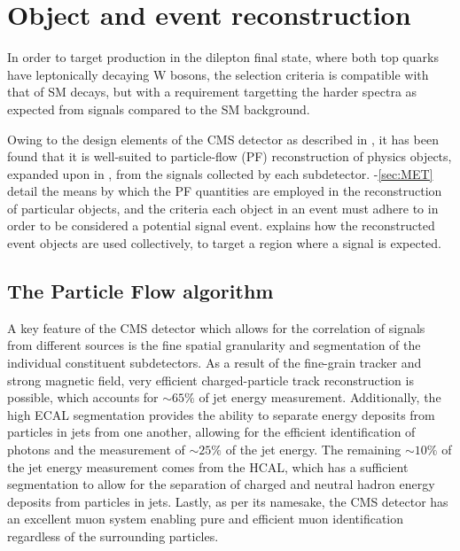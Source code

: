 \chapter{Object and event reconstruction}
\label{chap:eventreco}

In order to target \ttDM production in the dilepton final state, where both top quarks have leptonically decaying W bosons, the selection criteria is compatible with that of SM \ttll decays, but with a requirement targetting the harder \MET spectra as expected from signals compared to the SM background.

Owing to the design elements of the CMS detector as described in , it has been found that it is well-suited to particle-flow (PF) reconstruction of physics objects, expanded upon in , from the signals collected by each subdetector. -\ref{sec:MET} detail the means by which the PF quantities are employed in the reconstruction of particular objects, and the criteria each object in an event must adhere to in order to be considered a potential signal event.  explains how the reconstructed event objects are used collectively, to target a region where a \ttllDM signal is expected.

\section{The Particle Flow algorithm}
\label{sec:PF}

A key feature of the CMS detector which allows for the correlation of signals from different sources is the fine spatial granularity and segmentation of the individual constituent subdetectors. As a result of the fine-grain tracker and strong magnetic field, very efficient charged-particle track reconstruction is possible, which accounts for $\sim 65\%$ of jet energy measurement. Additionally, the high ECAL segmentation provides the ability to separate energy deposits from particles in jets from one another, allowing for the efficient identification of photons and the measurement of $\sim 25\%$ of the jet energy. The remaining $\sim 10\%$ of the jet energy measurement comes from the HCAL, which has a sufficient segmentation to allow for the separation of charged and neutral hadron energy deposits from particles in jets. Lastly, as per its namesake, the CMS detector has an excellent muon system enabling pure and efficient muon identification regardless of the surrounding particles.

